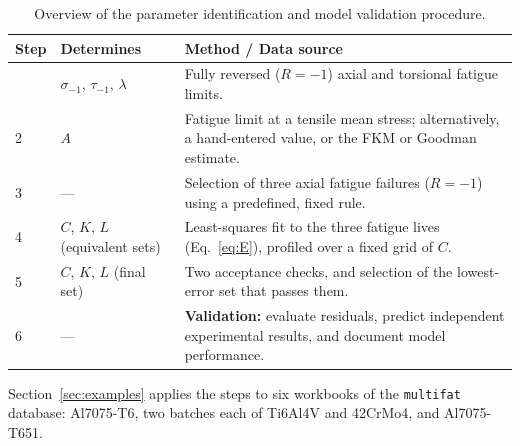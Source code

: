 \documentclass[11pt,a4paper]{article}
\newcommand{\sigm}{\sigma_{-1}}
\newcommand{\taum}{\tau_{-1}}
\begin{document}
\begin{table}[htbp]
\centering
\caption{Overview of the parameter identification and
model validation procedure.}
\label{tab:calibration_procedure}

\renewcommand{\arraystretch}{1.35}
\setlength{\tabcolsep}{8pt}

\begin{tabularx}{\textwidth}{
    @{}
    >{\centering\arraybackslash}p{}
    >{\raggedright\arraybackslash}p{}
    >{\raggedright\arraybackslash}X
    @{}
}
\toprule
\textbf{Step} &
\textbf{Determines} &
\textbf{Method / Data source} \\
\midrule

1
& $\sigm$, $\taum$, $\lambda$
& Fully reversed ($R=-1$) axial and torsional
fatigue limits. \\

\addlinespace[3pt]

2
& $A$
& Fatigue limit at a tensile mean stress;
alternatively, a hand-entered value, or the FKM or Goodman estimate. \\

\addlinespace[3pt]

3
& ---
& Selection of three axial fatigue failures
($R=-1$) using a predefined, fixed rule. \\

\addlinespace[3pt]

4
& $C$, $K$, $L$ (equivalent sets)
& Least-squares fit to the three fatigue lives
(Eq.~\ref{eq:E}), profiled over a fixed grid of $C$. \\

\addlinespace[3pt]

5
& $C$, $K$, $L$ (final set)
& Two acceptance checks, and selection
of the lowest-error set that passes them. \\

\midrule

6
& ---
& \textbf{Validation:} evaluate residuals,
predict independent experimental results,
and document model performance. \\

\bottomrule
\end{tabularx}
\end{table}
Section~\ref{sec:examples} applies the steps to six workbooks of the \texttt{multifat} database: Al7075-T6,
two batches each of Ti6Al4V and 42CrMo4, and Al7075-T651.

\end{document}
